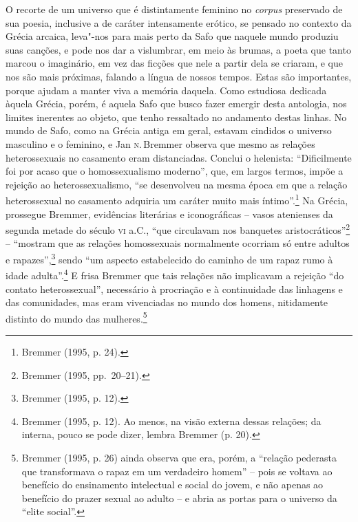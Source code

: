 O recorte de um universo que é distintamente feminino no \textit{corpus} preservado de sua poesia, inclusive
a de caráter intensamente erótico, se pensado no contexto da Grécia arcaica, leva"-nos para mais perto da Safo que naquele mundo produziu suas canções, e pode nos dar a vislumbrar, em meio às brumas, a poeta que tanto marcou o imaginário, em vez das ficções que nele a partir dela se criaram, e que nos são mais próximas, falando a língua de nossos tempos. Estas são importantes, porque ajudam a manter viva a memória daquela. Como estudiosa dedicada àquela Grécia, porém, é aquela Safo que busco fazer emergir desta antologia, nos limites inerentes ao objeto, que tenho ressaltado no andamento destas linhas. No mundo
de Safo, como na Grécia antiga em geral, estavam cindidos o universo masculino
e o feminino, e Jan \textsc{n}.\,Bremmer observa que mesmo as relações
heterossexuais no casamento eram distanciadas. Conclui o helenista:
“Dificilmente foi por acaso que o homossexualismo moderno”, que, em largos termos, impõe
a rejeição ao heterossexualismo, “se desenvolveu na mesma época em que a
relação heterossexual no casamento adquiria um caráter muito mais íntimo”.\footnote{ Bremmer (1995, p. 24).} Na
Grécia, prossegue Bremmer, evidências literárias e iconográficas -- vasos
atenienses da segunda metade do século \textsc{vi} a.C., “que circulavam nos banquetes
aristocráticos”\footnote{ Bremmer (1995, pp.~20--21).} -- “mostram que as relações homossexuais normalmente
ocorriam só entre adultos e rapazes”,\footnote{ Bremmer (1995, p. 12).} sendo “um aspecto estabelecido do
caminho de um rapaz rumo à idade adulta”.\footnote{ Bremmer (1995, p. 12). Ao menos, na visão
externa dessas relações; da interna, pouco se pode dizer, lembra Bremmer (p.
20).} E frisa Bremmer que tais relações não implicavam a rejeição “do contato
heterossexual”, necessário à procriação e à continuidade das linhagens e das
comunidades, mas eram vivenciadas no mundo dos homens, nitidamente distinto do
mundo das mulheres.\footnote{ Bremmer (1995, p. 26) ainda observa que era,
porém, a “relação pederasta que transformava o rapaz em um verdadeiro homem” --
pois se voltava ao benefício do ensinamento intelectual e social do jovem, e
não apenas ao benefício do prazer sexual ao adulto -- e abria as portas para o
universo da “elite social”.}

